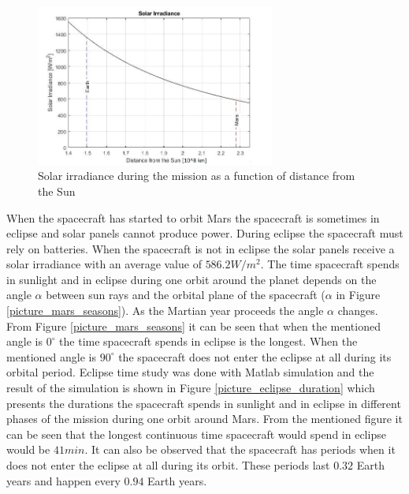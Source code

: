 \documentclass[a4paper, oneside, 11pt]{article}
\begin{document}
\begin{figure}[h]
	\centering 
	\includegraphics[width=0.7\textwidth]
    {Pictures/solar_irradiance.jpg}
    \caption{Solar irradiance during the mission as a function of distance from the Sun}
    \label{picture_solar_irradiance}
\end{figure}

\noindent When the spacecraft has started to orbit Mars the spacecraft is sometimes in eclipse and solar panels cannot produce power. During eclipse the spacecraft must rely on batteries. When the spacecraft is not in eclipse the solar panels receive a solar irradiance with an average value of $586.2W/m^2$. The time spacecraft spends in sunlight and in eclipse during one orbit around the planet depends on the angle $\alpha$ between sun rays and the orbital plane of the spacecraft ($\alpha$ in Figure \ref{picture_mars_seasons}). As the Martian year proceeds the angle $\alpha$ changes. From Figure \ref{picture_mars_seasons} it can be seen that when the mentioned angle is $0^{\circ}$ the time spacecraft spends in eclipse is the longest. When the mentioned angle is $90^{\circ}$ the spacecraft does not enter the eclipse at all during its orbital period. Eclipse time study was done with Matlab simulation and the result of the simulation is shown in Figure \ref{picture_eclipse_duration} which presents the durations the spacecraft spends in sunlight and in eclipse in different phases of the mission during one orbit around Mars. From the mentioned figure it can be seen that the longest continuous time spacecraft would spend in eclipse would be $41min$. It can also be observed that the spacecraft has periods when it does not enter the eclipse at all during its orbit. These periods last $0.32$ Earth years and happen every $0.94$ Earth years.\\
\end{document}
